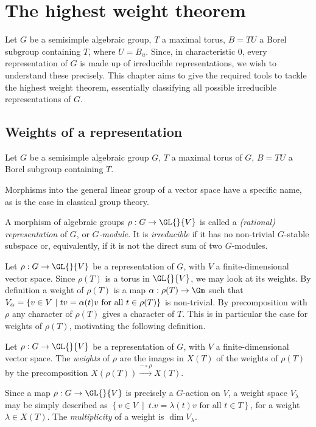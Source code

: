 \section{The highest weight theorem}

Let $G$ be a semisimple algebraic group, $T$ a maximal torus, $B = TU$ a Borel subgroup containing $T$, where $U = B_u$. Since, in characteristic $0$, every representation of $G$ is made up of irreducible representations, we wish to understand these precisely. This chapter aims to give the required tools to tackle the highest weight theorem, essentially classifying all possible irreducible representations of $G$.

\subsection{Weights of a representation}
Let $G$ be a semisimple algebraic group $G$, $T$ a maximal torus of $G$, $B = TU$ a Borel subgroup containing $T$.

Morphisms into the general linear group of a vector space have a specific name, as is the case in classical group theory.
\begin{defn}
    A morphism of algebraic groups $\rho: G \to \GL{}{V}$ is called a \emph{(rational) representation} of $G$, or \emph{$G$-module}. It is \emph{irreducible} if it has no non-trivial $G$-stable subspace or, equivalently, if it is not the direct sum of two $G$-modules.
\end{defn}
Let $\rho: G \to \GL{}{V}$ be a representation of $G$, with $V$ a finite-dimensional vector space. Since $\rho(T)$ is a torus in $\GL{}{V}$, we may look at its weights. By definition a weight of $\rho(T)$ is a map $\alpha: \rho(T) \to \Gm$ such that $V_\alpha = \left\{v \in V ~\middle|~ t v = \alpha(t) v \textnormal{ for all } t \in \rho(T) \right\}$ is non-trivial. By precomposition with $\rho$ any character of $\rho(T)$ gives a character of $T$. This is in particular the case for weights of $\rho(T)$, motivating the following definition.
\begin{defn}
    Let $\rho: G \to \GL{}{V}$ be a representation of $G$, with $V$ a finite-dimensional vector space. The \emph{weights} of $\rho$ are the images in $X(T)$ of the weights of $\rho(T)$ by the precomposition $X(\rho(T)) \xrightarrow{- \circ \rho} X(T)$.
\end{defn}

Since a map $\rho : G \to \GL{}{V}$ is precisely a $G$-action on $V$, a weight space $V_\lambda$ may be simply described as $\left\{v \in V ~\middle|~ t.v = \lambda(t) v \text{ for all } t \in T\right\}$, for a weight $\lambda \in X(T)$. The \emph{multiplicity} of a weight is $\dim V_\lambda$.

